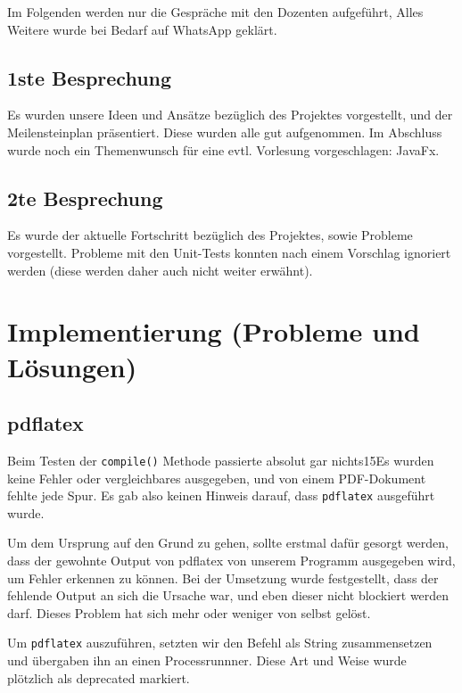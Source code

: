\documentclass[stu, a4paper, 11pt, floatsintext]{apa7}
\begin{document}
\noindent Im Folgenden werden nur die Gespräche mit den Dozenten aufgeführt,
Alles Weitere wurde bei Bedarf auf WhatsApp geklärt.

\subsection{1ste Besprechung}

\noindent Es wurden unsere Ideen und Ansätze bezüglich des Projektes vorgestellt,
und der Meilensteinplan präsentiert.
Diese wurden alle gut aufgenommen.
Im Abschluss wurde noch ein Themenwunsch für eine evtl. Vorlesung vorgeschlagen: JavaFx.

\subsection{2te Besprechung}

\noindent Es wurde der aktuelle Fortschritt bezüglich des Projektes, sowie Probleme vorgestellt.
Probleme mit den Unit-Tests konnten nach einem Vorschlag ignoriert werden (diese werden daher auch nicht weiter erwähnt).

\clearpage

\section{Implementierung (Probleme und Lösungen)}

\subsection{pdflatex}

\noindent Beim Testen der \texttt{compile()} Methode passierte absolut gar nichts15Es wurden keine Fehler oder vergleichbares ausgegeben, und von einem PDF-Dokument fehlte jede Spur.
Es gab also keinen Hinweis darauf, dass \texttt{pdflatex} ausgeführt wurde.

Um dem Ursprung auf den Grund zu gehen, sollte erstmal dafür gesorgt werden,
dass der gewohnte Output von pdflatex von unserem Programm ausgegeben wird, um Fehler erkennen zu können.
Bei der Umsetzung wurde festgestellt, dass der fehlende Output an sich die Ursache war, und eben dieser nicht blockiert werden darf.
Dieses Problem hat sich mehr oder weniger von selbst gelöst.

Um \texttt{pdflatex} auszuführen, setzten wir den Befehl als String zusammensetzen und übergaben ihn an einen Processrunnner.
Diese Art und Weise wurde plötzlich als deprecated markiert.
\end{document}
